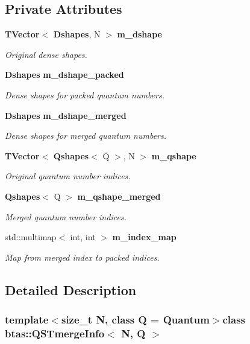 \subsection*{Private Attributes}
\begin{DoxyCompactItemize}
\item 
{\bf T\-Vector}$<$ {\bf Dshapes}, N $>$ {\bf m\-\_\-dshape}
\begin{DoxyCompactList}\small\item\em Original dense shapes. \end{DoxyCompactList}\item 
{\bf Dshapes} {\bf m\-\_\-dshape\-\_\-packed}
\begin{DoxyCompactList}\small\item\em Dense shapes for packed quantum numbers. \end{DoxyCompactList}\item 
{\bf Dshapes} {\bf m\-\_\-dshape\-\_\-merged}
\begin{DoxyCompactList}\small\item\em Dense shapes for merged quantum numbers. \end{DoxyCompactList}\item 
{\bf T\-Vector}$<$ {\bf Qshapes}$<$ Q $>$, N $>$ {\bf m\-\_\-qshape}
\begin{DoxyCompactList}\small\item\em Original quantum number indices. \end{DoxyCompactList}\item 
{\bf Qshapes}$<$ Q $>$ {\bf m\-\_\-qshape\-\_\-merged}
\begin{DoxyCompactList}\small\item\em Merged quantum number indices. \end{DoxyCompactList}\item 
std\-::multimap$<$ int, int $>$ {\bf m\-\_\-index\-\_\-map}
\begin{DoxyCompactList}\small\item\em Map from merged index to packed indices. \end{DoxyCompactList}\end{DoxyCompactItemize}


\subsection{Detailed Description}
\subsubsection*{template$<$size\-\_\-t N, class Q = Quantum$>$class btas\-::\-Q\-S\-Tmerge\-Info$<$ N, Q $>$}

